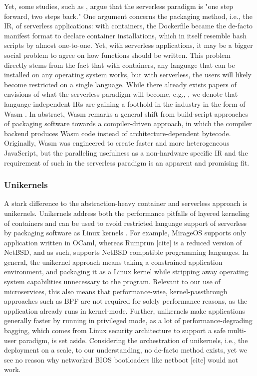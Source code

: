 \documentclass{IEEEtran}
\begin{document}
Yet, some studies, such as \cite{hellerstein2018serverless}, argue that the serverless paradigm is "one step forward, two steps back." One argument concerns the packaging method, i.e., the \gls{IR}, of serverless applications: with containers, the Dockerfile became the de-facto manifest format to declare container installations, which in itself resemble bash scripts by almost one-to-one. Yet, with serverless applications, it may be a bigger social problem to agree on how functions should be written. This problem directly stems from the fact that with containers, any language that can be installed on any operating system works, but with serverless, the users will likely become restricted on a single language. While there already exists papers of envisions of what the serverless paradigm will become, e.g., \cite{jonas2019cloud}, we denote that language-independent \glspl{IR} are gaining a foothold in the industry in the form of \gls{Wasm} \cite{haas2017bringing}. In abstract, \gls{Wasm} remarks a general shift from build-script approaches of packaging software towards a compiler-driven approach, in which the compiler backend produces \gls{Wasm} code instead of architecture-dependent bytecode. Originally, \gls{Wasm} was engineered to create faster and more heterogeneous JavaScript, but the paralleling usefulness as a non-hardware specific \gls{IR} and the requirement of such in the serverless paradigm is an apparent and promising fit.

\subsubsection{Unikernels}

A stark difference to the abstraction-heavy container and serverless approach is unikernels. Unikernels address both the performance pitfalls of layered kerneling of containers and can be used to avoid restricted language support of serverless by packaging software as Linux kernels \cite{raza2019unikernels}. For example, MirageOS \cite{imada2018mirageos} supports only application written in OCaml, whereas Rumprun [cite] is a reduced version of NetBSD, and as such, supports NetBSD compatible programming languages. In general, the unikernel approach means taking a constrained application environment, and packaging it as a Linux kernel \cite{raza2019unikernels} while stripping away operating system capabilities unnecessary to the program. Relevant to our use of microservices, this also means that performance-wise, kernel-passthrough approaches such as \gls{BPF} are not required for solely performance reasons, as the application already runs in kernel-mode. Further, unikernels make applications generally faster by running in privileged mode, as a lot of performance-degrading bagging, which comes from Linux security architecture to support a safe multi-user paradigm, is set aside. Considering the orchestration of unikernels, i.e., the deployment on a scale, to our understanding, no de-facto method exists, yet we see no reason why networked \gls{BIOS} bootloaders like netboot [cite] would not work.
\end{document}
